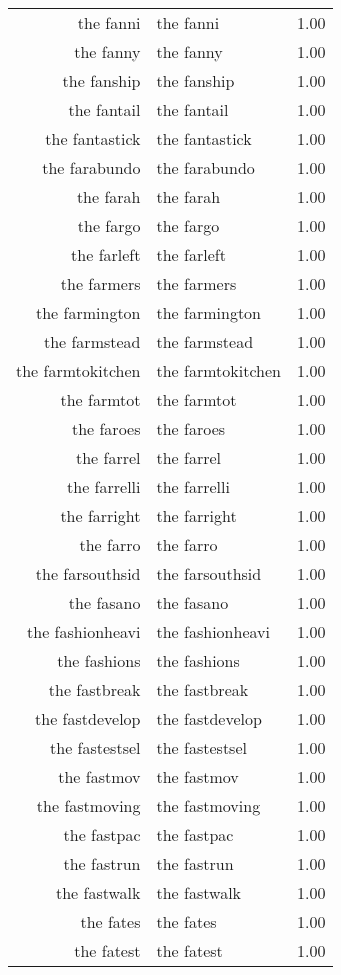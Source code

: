 \begin{table}[ht]
\begin{tabular}{rlr}
  the fanni & the fanni & 1.00 \\ 
  the fanny & the fanny & 1.00 \\ 
  the fanship & the fanship & 1.00 \\ 
  the fantail & the fantail & 1.00 \\ 
  the fantastick & the fantastick & 1.00 \\ 
  the farabundo & the farabundo & 1.00 \\ 
  the farah & the farah & 1.00 \\ 
  the fargo & the fargo & 1.00 \\ 
  the farleft & the farleft & 1.00 \\ 
  the farmers & the farmers & 1.00 \\ 
  the farmington & the farmington & 1.00 \\ 
  the farmstead & the farmstead & 1.00 \\ 
  the farmtokitchen & the farmtokitchen & 1.00 \\ 
  the farmtot & the farmtot & 1.00 \\ 
  the faroes & the faroes & 1.00 \\ 
  the farrel & the farrel & 1.00 \\ 
  the farrelli & the farrelli & 1.00 \\ 
  the farright & the farright & 1.00 \\ 
  the farro & the farro & 1.00 \\ 
  the farsouthsid & the farsouthsid & 1.00 \\ 
  the fasano & the fasano & 1.00 \\ 
  the fashionheavi & the fashionheavi & 1.00 \\ 
  the fashions & the fashions & 1.00 \\ 
  the fastbreak & the fastbreak & 1.00 \\ 
  the fastdevelop & the fastdevelop & 1.00 \\ 
  the fastestsel & the fastestsel & 1.00 \\ 
  the fastmov & the fastmov & 1.00 \\ 
  the fastmoving & the fastmoving & 1.00 \\ 
  the fastpac & the fastpac & 1.00 \\ 
  the fastrun & the fastrun & 1.00 \\ 
  the fastwalk & the fastwalk & 1.00 \\ 
  the fates & the fates & 1.00 \\ 
  the fatest & the fatest & 1.00 \\ 

\end{tabular}
\end{table}
